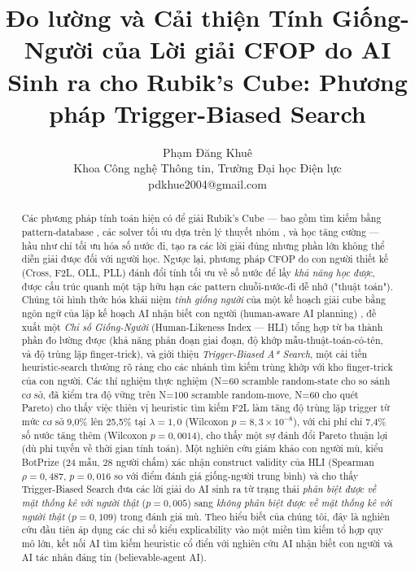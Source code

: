\documentclass[10pt,conference]{article}
\title{Đo lường và Cải thiện Tính Giống-Người của Lời giải CFOP do AI
Sinh ra cho Rubik's Cube: Phương pháp Trigger-Biased Search}
\author{
  Phạm Đăng Khuê \\
  Khoa Công nghệ Thông tin, Trường Đại học Điện lực\\
  pdkhue2004@gmail.com
}
\date{}
\begin{document}
\maketitle

\begin{abstract}
Các phương pháp tính toán hiện có để giải Rubik's Cube — bao gồm tìm
kiếm bằng pattern-database \citep{korf1997}, các solver tối ưu dựa trên
lý thuyết nhóm \citep{rokicki2014,kociemba}, và học tăng cường
\citep{mcaleer2018} — hầu như chỉ tối ưu hóa số nước đi, tạo ra các lời
giải đúng nhưng phần lớn không thể diễn giải được đối với người học.
Ngược lại, phương pháp CFOP do con người thiết kế (Cross, F2L, OLL,
PLL) đánh đổi tính tối ưu về số nước để lấy \emph{khả năng học được},
được cấu trúc quanh một tập hữu hạn các pattern chuỗi-nước-đi dễ nhớ
("thuật toán"). Chúng tôi hình thức hóa khái niệm \emph{tính giống
người} của một kế hoạch giải cube bằng ngôn ngữ của lập kế hoạch AI
nhận biết con người (human-aware AI planning)
\citep{kulkarni2016,chakraborti2019}, đề xuất một \emph{Chỉ số
Giống-Người} (Human-Likeness Index — HLI) tổng hợp từ ba thành phần đo
lường được (khả năng phân đoạn giai đoạn, độ khớp mẫu-thuật-toán-có-tên,
và độ trùng lặp finger-trick), và giới thiệu \emph{Trigger-Biased A*
Search}, một cải tiến heuristic-search thưởng rõ ràng cho các nhánh tìm
kiếm trùng khớp với kho finger-trick của con người. Các thí nghiệm thực
nghiệm (N=60 scramble random-state cho so sánh cơ sở, đã kiểm tra độ
vững trên N=100 scramble random-move, N=60 cho quét Pareto) cho thấy
việc thiên vị heuristic tìm kiếm F2L làm tăng độ trùng lặp trigger từ mức cơ
sở 9,0\% lên 25,5\% tại $\lambda=1,0$ (Wilcoxon $p=8,3\times10^{-8}$),
với chi phí chỉ 7,4\% số nước tăng thêm (Wilcoxon $p=0,0014$), cho thấy
một sự đánh đổi Pareto thuận lợi (dù phi tuyến về thời gian tính toán).
Một nghiên cứu giám khảo con người mù, kiểu BotPrize
\citep{hingston2009} (24 mẫu, 28 người chấm) xác nhận construct
validity của HLI (Spearman $\rho=0,487$, $p=0,016$ so với điểm đánh giá
giống-người trung bình) và cho thấy Trigger-Biased Search đưa các lời
giải do AI sinh ra từ trạng thái \emph{phân biệt được về mặt thống kê
với người thật} ($p=0,005$) sang \emph{không phân biệt được về mặt
thống kê với người thật} ($p=0,109$) trong đánh giá mù. Theo hiểu biết
của chúng tôi, đây là nghiên cứu đầu tiên áp dụng các chỉ số kiểu
explicability vào một miền tìm kiếm tổ hợp quy mô lớn, kết nối AI tìm
kiếm heuristic cổ điển với nghiên cứu AI nhận biết con người và AI tác
nhân đáng tin (believable-agent AI).
\end{abstract}
\end{document}
